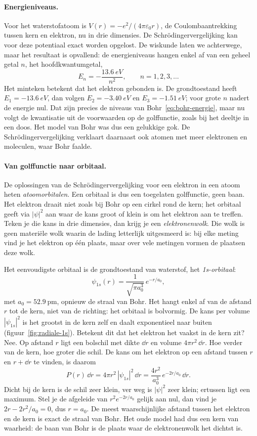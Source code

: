 \paragraph{Energieniveaus.}
Voor het waterstofatoom is $V(r)= -e^2/(4\pi\varepsilon_0 r)$, de Coulombaantrekking tussen kern en elektron, nu in drie dimensies. De Schr\"odingervergelijking kan voor deze potentiaal exact worden opgelost. De wiskunde laten we achterwege, maar het resultaat is opvallend: de energieniveaus hangen enkel af van een geheel getal $n$, het hoofdkwantumgetal,
\begin{equation}
E_n = -\frac{\SI{13.6}{eV}}{n^2}, \qquad n = 1,2,3,\ldots
\end{equation}
Het minteken betekent dat het elektron gebonden is. De grondtoestand heeft $E_1 = \SI{-13.6}{eV}$, dan volgen $E_2 = \SI{-3.40}{eV}$ en $E_3 = \SI{-1.51}{eV}$; voor grote $n$ nadert de energie nul. Dat zijn precies de niveaus van Bohr~\eqref{eq:bohr-energie}, maar nu volgt de kwantisatie uit de voorwaarden op de golffunctie, zoals bij het deeltje in een doos. Het model van Bohr was dus een gelukkige gok. De Schr\"odingervergelijking verklaart daarnaast ook atomen met meer elektronen en moleculen, waar Bohr faalde.

\paragraph{Van golffunctie naar orbitaal.}
De oplossingen van de Schr\"odingervergelijking voor een elektron in een atoom heten \emph{atoomorbitalen}. Een orbitaal is dus een toegelaten golffunctie, geen baan. Het elektron draait niet zoals bij Bohr op een cirkel rond de kern; het orbitaal geeft via $|\psi|^2$ aan waar de kans groot of klein is om het elektron aan te treffen. Teken je die kans in drie dimensies, dan krijg je een \emph{elektronenwolk}. Die wolk is geen materiële wolk waarin de lading letterlijk uitgesmeerd is: bij elke meting vind je het elektron op één plaats, maar over vele metingen vormen de plaatsen deze wolk.

Het eenvoudigste orbitaal is de grondtoestand van waterstof, het \emph{1s-orbitaal}:
\[
\psi_{1s}(r) = \frac{1}{\sqrt{\pi a_0^3}}\,e^{-r/a_0},
\]
met $a_0 = \SI{52.9}{\pico\metre}$, opnieuw de straal van Bohr. Het hangt enkel af van de afstand $r$ tot de kern, niet van de richting: het orbitaal is bolvormig. De kans per volume $|\psi_{1s}|^2$ is het grootst in de kern zelf en daalt exponentieel naar buiten (figuur~\ref{fig:radiale-1s}). Betekent dit dat het elektron het vaakst in de kern zit? Nee. Op afstand $r$ ligt een bolschil met dikte $\dd r$ en volume $4\pi r^2\,\dd r$. Hoe verder van de kern, hoe groter die schil. De kans om het elektron op een afstand tussen $r$ en $r+\dd r$ te vinden, is daarom
\[
P(r)\,\dd r = 4\pi r^2\,|\psi_{1s}|^2\,\dd r = \frac{4r^2}{a_0^3}\,e^{-2r/a_0}\,\dd r .
\]
Dicht bij de kern is de schil zeer klein, ver weg is $|\psi|^2$ zeer klein; ertussen ligt een maximum. Stel je de afgeleide van $r^2e^{-2r/a_0}$ gelijk aan nul, dan vind je $2r - 2r^2/a_0 = 0$, dus $r = a_0$. De meest waarschijnlijke afstand tussen het elektron en de kern is exact de straal van Bohr. Het oude model had dus een kern van waarheid: de baan van Bohr is de plaats waar de elektronenwolk het dichtst is.

